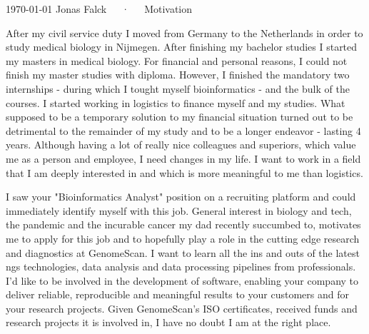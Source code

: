 \documentclass[11pt, a4paper]{awesome-cv}
\begin{document}
\makecvheader[R]

\makecvfooter
  {\today}
  {Jonas Falck~~~·~~~Motivation}
  {}

\makelettertitle

\begin{cvletter}

After my civil service duty I moved from Germany to the Netherlands in order to study medical biology in Nijmegen. After finishing my bachelor studies I started my masters in medical biology.
For financial and personal reasons, I could not finish my master studies with diploma.
However, I finished the mandatory two internships - during which I tought myself bioinformatics - and the bulk of the courses.
I started working in logistics to finance myself and my studies.
What supposed to be a temporary solution to my financial situation turned out to be detrimental to the remainder of my study and to be a longer endeavor - lasting 4 years.
Although having a lot of really nice colleagues and superiors, which value me as a person and employee, I need changes in my life.
I want to work in a field that I am deeply interested in and which is more meaningful to me than logistics.

I saw your "Bioinformatics Analyst" position on a recruiting platform and could immediately identify myself with this job. 
General interest in biology and tech, the pandemic and the incurable cancer my dad recently succumbed to, motivates me to apply for this job and to hopefully play a role in the cutting edge research and diagnostics at GenomeScan.
I want to learn all the ins and outs of the latest ngs technologies, data analysis and data processing pipelines from professionals. 
I'd like to be involved in the development of software, enabling your company to deliver reliable, reproducible and meaningful results to your customers and for your research projects.
Given GenomeScan's ISO certificates, received funds and research projects it is involved in, I have no doubt I am at the right place.


\end{cvletter}
\end{document}
